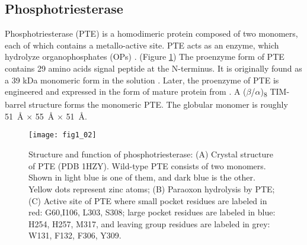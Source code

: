 \begin{refsection}
\subsection{Phosphotriesterase} 
\label{sec:pte-intro}

Phosphotriesterase (PTE) is a homodimeric protein composed of two monomers,
each of which contains a metallo-active site. PTE acts as an enzyme, which
hydrolyze organophosphates (OPs) \cite{Ghanem2005a}.  (Figure
\ref{fig:pte-structure}) The proenzyme form of PTE contains 29 amino acids
signal peptide at the N-terminus. It is originally found as a 39 kDa monomeric
form in the solution \cite{Mulbry1989}. Later, the proenzyme of PTE is
engineered and expressed in the form of mature protein from . A
($\beta$/$\alpha$)\textsubscript{8} TIM-barrel structure forms the monomeric
PTE\cite{Roodveldt2005,Seibert2005}. The globular monomer is roughly \SI{51}{\angstrom}
$\times$ \SI{55}{\angstrom} $\times$ \SI{51}{\angstrom}.

\begin{figure}[h!] \centering \texttt{[image: fig1\_02]}
    \caption[Structure and function of phosphotriesterase: (A) Crystal
    structure of PTE (PDB 1HZY). Wild-type PTE consists of two monomers. Shown
    in light blue is one of them, and dark blue is the other. Yellow dots
    represent zinc atoms; (B) Paraoxon hydrolysis by PTE; (C) Active site of
    PTE where small pocket residues are labeled in red: G60,I106, L303, S308;
    large pocket residues are labeled in blue: H254, H257, M317, and leaving
    group residues are labeled in grey: W131, F132, F306, Y309.] {Structure and
        function of phosphotriesterase: (A) Crystal structure of PTE (PDB
        1HZY). Wild-type PTE consists of two monomers.  Shown in light blue is
        one of them, and dark blue is the other. Yellow dots represent zinc
        atoms; (B) Paraoxon hydrolysis by PTE;  (C)  Active site of PTE where
        small pocket residues are labeled in red: G60,I106, L303, S308; large
        pocket residues are labeled in blue: H254, H257, M317, and leaving
        group residues are labeled in grey: W131, F132, F306, Y309.}
\label{fig:pte-structure} 
\end{figure} 


\end{refsection}

